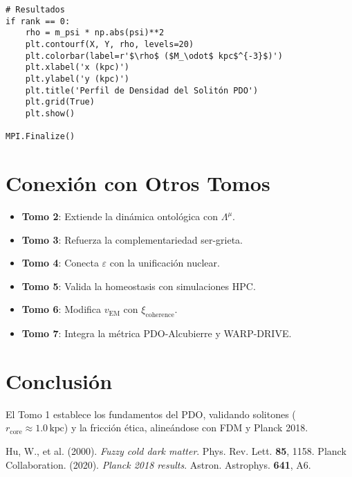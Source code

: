 \documentclass[a4paper,12pt]{article}
\newcommand{\eps}{\varepsilon}
\newcommand{\rcore}{r_{\text{core}}}
\newcommand{\Lambdaa}{\Lambda}
\begin{document}
\begin{verbatim}
# Resultados
if rank == 0:
    rho = m_psi * np.abs(psi)**2
    plt.contourf(X, Y, rho, levels=20)
    plt.colorbar(label=r'$\rho$ ($M_\odot$ kpc$^{-3}$)')
    plt.xlabel('x (kpc)')
    plt.ylabel('y (kpc)')
    plt.title('Perfil de Densidad del Solitón PDO')
    plt.grid(True)
    plt.show()

MPI.Finalize()
\end{verbatim}

\section{Conexión con Otros Tomos}
\begin{itemize}
    \item \textbf{Tomo 2}: Extiende la dinámica ontológica con \(\Lambdaa^\mu\).
    \item \textbf{Tomo 3}: Refuerza la complementariedad ser-grieta.
    \item \textbf{Tomo 4}: Conecta \(\eps\) con la unificación nuclear.
    \item \textbf{Tomo 5}: Valida la homeostasis con simulaciones HPC.
    \item \textbf{Tomo 6}: Modifica \(v_{\text{EM}}\) con \(\xi_{\text{coherence}}\).
    \item \textbf{Tomo 7}: Integra la métrica PDO-Alcubierre y WARP-DRIVE.
\end{itemize}

\section{Conclusión}
El Tomo 1 establece los fundamentos del PDO, validando solitones (\(\rcore \approx 1.0 \, \text{kpc}\)) y la fricción ética, alineándose con FDM y Planck 2018.


\begin{thebibliography}{9}
Hu, W., et al. (2000). \textit{Fuzzy cold dark matter}. Phys. Rev. Lett. \textbf{85}, 1158.
Planck Collaboration. (2020). \textit{Planck 2018 results}. Astron. Astrophys. \textbf{641}, A6.
\end{thebibliography}
\end{document}
